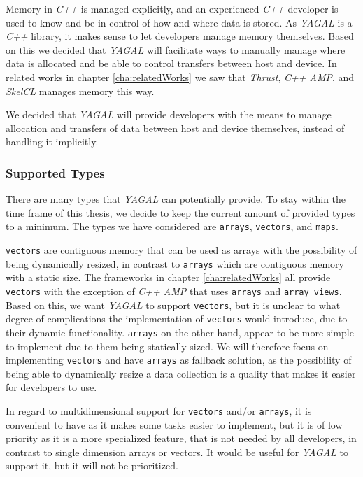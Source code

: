 Memory in \textit{C++} is managed explicitly, and an experienced \textit{C++} developer is used to know and be in control of how and where data is stored. As \textit{YAGAL} is a \textit{C++} library, it makes sense to let developers manage memory themselves. Based on this we decided that \textit{YAGAL} will facilitate ways to manually manage where data is allocated and be able to control transfers between host and device. In related works in chapter \ref{cha:relatedWorks} we saw that \textit{Thrust}, \textit{C++ AMP}, and \textit{SkelCL} manages memory this way.

We decided that \textit{YAGAL} will provide developers with the means to manage allocation and transfers of data between host and device themselves, instead of handling it implicitly.

\subsubsection{Supported Types}
There are many types that \textit{YAGAL} can potentially provide. To stay within the time frame of this thesis, we decide to keep the current amount of provided types to a minimum. The types we have considered are \texttt{arrays}, \texttt{vectors}, and \texttt{maps}.

\texttt{vectors} are contiguous memory that can be used as arrays with the possibility of being dynamically resized, in contrast to \texttt{arrays} which are contiguous memory with a static size. The frameworks in chapter \ref{cha:relatedWorks} all provide \texttt{vectors} with the exception of \textit{C++ AMP} that uses \texttt{arrays} and \texttt{array\_views}. Based on this, we want \textit{YAGAL} to support \texttt{vectors}, but it is unclear to what degree of complications the implementation of \texttt{vectors} would introduce, due to their dynamic functionality. \texttt{arrays} on the other hand, appear to be more simple to implement due to them being statically sized. We will therefore focus on implementing \texttt{vectors} and have \texttt{arrays} as fallback solution, as the possibility of being able to dynamically resize a data collection is a quality that makes it easier for developers to use.

In regard to multidimensional support for \texttt{vectors} and/or \texttt{arrays}, it is convenient to have as it makes some tasks easier to implement, but it is of low priority as it is a more specialized feature, that is not needed by all developers, in contrast to single dimension arrays or vectors. It would be useful for \textit{YAGAL} to support it, but it will not be prioritized.


